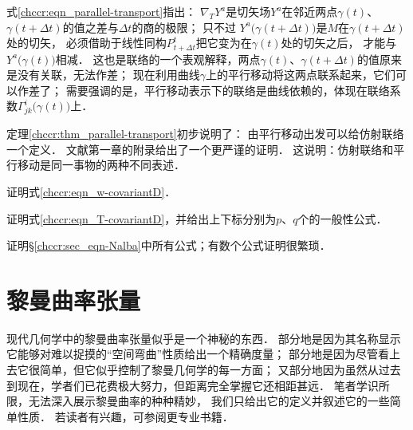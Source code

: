 式\eqref{chccr:eqn_parallel-transport}指出：
$\nabla_T Y^a$是切矢场$Y^a$在邻近两点$\gamma(t)$、
$\gamma(t+\Delta t)$的值之差与$\Delta t$的商的极限；
只不过 $Y^a\bigl(\gamma(t+\Delta t)\bigr)$是$M$在$\gamma(t+\Delta t)$处的切矢，
必须借助于线性同构$P_{t+\Delta t}^t$把它变为在$\gamma(t)$处的切矢之后，
才能与$Y^a\bigl(\gamma(t)\bigr)$相减． 
这也是联络的一个表观解释，两点$\gamma(t)$、$\gamma(t+\Delta t)$的值原来是没有关联，无法作差；
现在利用曲线$\gamma$上的平行移动将这两点联系起来，它们可以作差了；
需要强调的是，平行移动表示下的联络是曲线依赖的，体现在联络系数$\Gamma^i_{jk}\bigl(\gamma(t)\bigr)$上．


定理\ref{chccr:thm_parallel-transport}初步说明了：
由平行移动出发可以给仿射联络一个定义．
文献\parencite{wuhx2014cb}第一章的附录给出了一个更严谨的证明．
这说明：仿射联络和平行移动是同一事物的两种不同表述．



\begin{exercise}
	证明式\eqref{chccr:eqn_w-covariantD}．
\end{exercise}

\begin{exercise}
	证明式\eqref{chccr:eqn_T-covariantD}，并给出上下标分别为$p$、$q$个的一般性公式．
\end{exercise}

\begin{exercise}
	证明\S\ref{chccr:sec_eqn-Nalba}中所有公式；有数个公式证明很繁琐．
\end{exercise}


\section{黎曼曲率张量}\label{chccr:sec_Curvatures}

现代几何学中的黎曼曲率张量似乎是一个神秘的东西．
部分地是因为其名称显示它能够对难以捉摸的“空间弯曲”性质给出一个精确度量；
部分地是因为尽管看上去它很简单，但它似乎控制了黎曼几何学的每一方面；
又部分地因为虽然从过去到现在，学者们已花费极大努力，但距离完全掌握它还相距甚远．
笔者学识所限，无法深入展示黎曼曲率的种种精妙，
我们只给出它的定义并叙述它的一些简单性质．
若读者有兴趣，可参阅更专业书籍．

